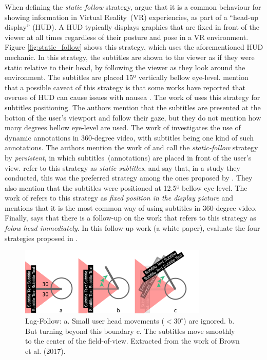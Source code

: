 When defining the \emph{static-follow} strategy, \cite{brown_subtitles_2017} argue that it is a common behaviour for showing information in Virtual Reality~(VR) experiencies, as part of a ``head-up display'' (HUD). A HUD typically displays graphics that are fixed in front of the viewer at all times regardless of their posture and pose in a VR environment. Figure \ref{fig:static_follow} shows this strategy, which uses the aforementioned HUD mechanic. In this strategy, the subtitles are shown to the viewer as if they were static relative to their head, by following the viewer as they look around the environment. The subtitles are placed 15º vertically bellow eye-level. \cite{brown_subtitles_2017} mention that a possible caveat of this strategy is that some works have reported that overuse of HUD can cause issues with nausea \cite{laviola2000discussion, sharples2008virtual}.
The work of \cite{meira_video_2016} uses this strategy for subtitles positioning. The authors mention that the subtitles are presented at the botton of the user's viewport and follow their gaze, but they do not mention how many degrees bellow eye-level are used. The work of \cite{matos_dynamic_2018} investigates the use of dynamic annotations in 360-degree video, with subtitles being one kind of such annotations. The authors mention the work of \cite{brown_subtitles_2017} and call the \emph{static-follow} strategy by \emph{persistent}, in which subtitles~(annotations) are placed in front of the user's view. \cite{rothe_dynamic_2018} refer to this strategy as \emph{static subtitles}, and say that, in a study they conducted, this was the preferred strategy among the ones proposed by \cite{brown_subtitles_2017}. They also mention that the subtitles were positioned at 12.5º bellow eye-level. The work of \cite{hughes_disruptive_2019} refers to this strategy as \emph{fixed position in the display picture} and mentions that it is the most common way of using subtitles in 360-degree video. Finally, \cite{montagud_culture_2020} says that there is a follow-up on the work \cite{brown_subtitles_2017} that refers to this strategy as \emph{folow head immediately}. In this follow-up work (a white paper), \cite{brown2018exploring} evaluate the four strategies proposed in \cite{brown_subtitles_2017}. 

\begin{figure}[!ht]
    \centering
    \includegraphics[width=0.8\textwidth]{img/video360/lag-follow.png}
    \caption{Lag-Follow: a. Small user head movements ($<30^{\circ}$) are ignored. b. But turning beyond this boundary c. The subtitles move smoothly to the center of the field-of-view. Extracted from the work of Brown et al. (2017).}
    \label{fig:lag_follow}
\end{figure}

